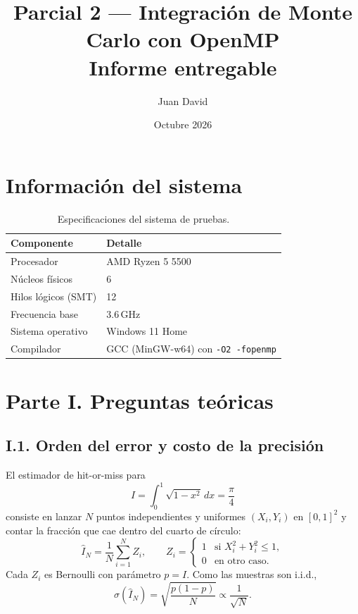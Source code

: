 \documentclass[12pt,a4paper]{article}
\title{Parcial 2 --- Integraci\'on de Monte Carlo con OpenMP\\[4pt]
       \large Informe entregable}
\author{Juan David}
\date{Octubre 2026}
\begin{document}
\maketitle
\tableofcontents
\newpage

\section{Informaci\'on del sistema}

\begin{table}[ht]
  \centering
  \caption{Especificaciones del sistema de pruebas.}
  \label{tab:sistema}
  \begin{tabular}{ll}
    \toprule
    Componente & Detalle \\
    \midrule
    Procesador          & AMD Ryzen 5 5500 \\
    N\'ucleos f\'isicos & 6 \\
    Hilos l\'ogicos (SMT)& 12 \\
    Frecuencia base     & 3.6\,GHz \\
    Sistema operativo   & Windows 11 Home \\
    Compilador          & GCC (MinGW-w64) con \texttt{-O2 -fopenmp} \\
    \bottomrule
  \end{tabular}
\end{table}

\section{Parte I. Preguntas te\'oricas}

\subsection{I.1. Orden del error y costo de la precisi\'on}

El estimador de hit-or-miss para
\[
I = \int_0^1 \sqrt{1-x^2}\,dx = \frac{\pi}{4}
\]
consiste en lanzar $N$ puntos independientes y uniformes $(X_i,Y_i)$ en $[0,1]^2$ y contar la fracci\'on que cae dentro del cuarto de c\'irculo:
\[
\hat I_N = \frac{1}{N}\sum_{i=1}^{N} Z_i,
\qquad
Z_i =
\begin{cases}
1 & \text{si } X_i^2 + Y_i^2 \le 1,\\
0 & \text{en otro caso.}
\end{cases}
\]
Cada $Z_i$ es Bernoulli con par\'ametro $p = I$. Como las muestras son i.i.d.,
\[
\sigma(\hat I_N) = \sqrt{\frac{p(1-p)}{N}} \propto \frac{1}{\sqrt{N}}.
\]
\end{document}

